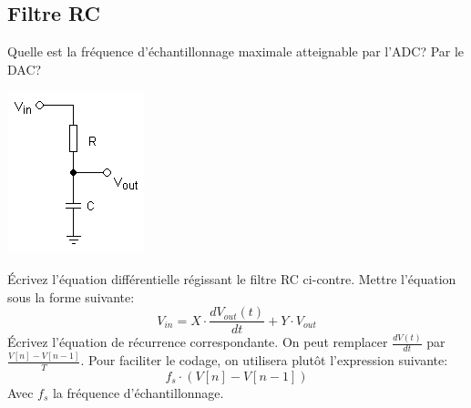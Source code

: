 \documentclass[12pt,%
addpoints,%
]{exam}
\begin{document}
\newpage
\subsection{Filtre RC}
\begin{questions}
	\question Quelle est la fréquence d'échantillonnage maximale atteignable par l'ADC? Par le DAC?\\
	\begin{minipage}[c]{.26\linewidth}
        \center
		\includegraphics[width=\linewidth]{figures/rc.png}
    \end{minipage}
    \hfill
    \begin{minipage}[c]{.66\linewidth}
		\vspace{1em}
		\question Écrivez l'équation différentielle régissant le filtre RC ci-contre.
		Mettre l'équation sous la forme suivante:
		$$V_{in} = X \cdot \frac{dV_{out}(t)}{dt} + Y \cdot V_{out}$$
		\question Écrivez l'équation de récurrence correspondante. On peut remplacer $\frac{dV(t)}{dt}$ par $\frac{V[n] - V[n-1]}{T}$.
		Pour faciliter le codage, on utilisera plutôt l'expression suivante:
		$$f_s \cdot \left(V[n] - V[n-1]\right)$$
		Avec $f_s$ la fréquence d'échantillonnage.

\end{minipage}
\end{questions}
\end{document}
